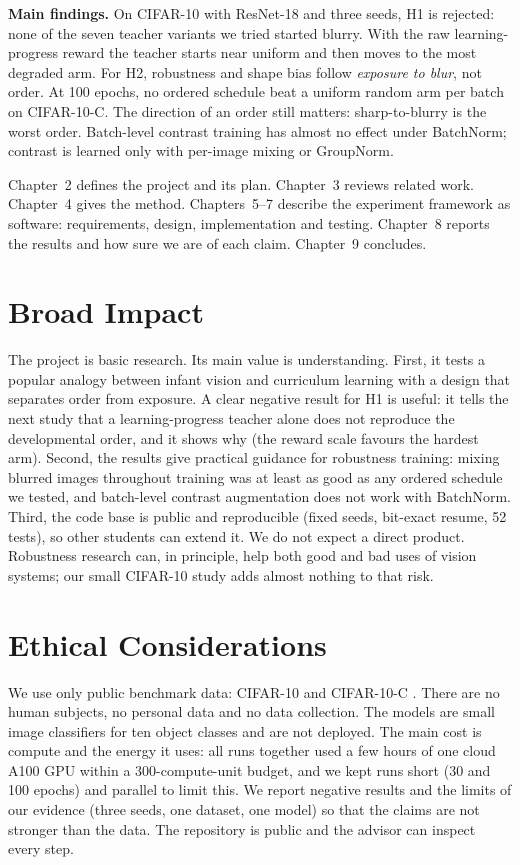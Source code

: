 \documentclass[a4paper,12pt]{report}
\begin{document}
\textbf{Main findings.} On CIFAR-10 with ResNet-18 and three seeds, H1 is rejected: none of the seven teacher variants we tried started blurry. With the raw learning-progress reward the teacher starts near uniform and then moves to the most degraded arm. For H2, robustness and shape bias follow \emph{exposure to blur}, not order. At 100 epochs, no ordered schedule beat a uniform random arm per batch on CIFAR-10-C. The direction of an order still matters: sharp-to-blurry is the worst order. Batch-level contrast training has almost no effect under BatchNorm; contrast is learned only with per-image mixing or GroupNorm.

Chapter~2 defines the project and its plan. Chapter~3 reviews related work. Chapter~4 gives the method. Chapters~5--7 describe the experiment framework as software: requirements, design, implementation and testing. Chapter~8 reports the results and how sure we are of each claim. Chapter~9 concludes.

\section{Broad Impact}

The project is basic research. Its main value is understanding. First, it tests a popular analogy between infant vision and curriculum learning with a design that separates order from exposure. A clear negative result for H1 is useful: it tells the next study that a learning-progress teacher alone does not reproduce the developmental order, and it shows why (the reward scale favours the hardest arm). Second, the results give practical guidance for robustness training: mixing blurred images throughout training was at least as good as any ordered schedule we tested, and batch-level contrast augmentation does not work with BatchNorm. Third, the code base is public and reproducible (fixed seeds, bit-exact resume, 52 tests), so other students can extend it. We do not expect a direct product. Robustness research can, in principle, help both good and bad uses of vision systems; our small CIFAR-10 study adds almost nothing to that risk.

\section{Ethical Considerations}

We use only public benchmark data: CIFAR-10 \cite{krizhevsky2009} and CIFAR-10-C \cite{hendrycks2019}. There are no human subjects, no personal data and no data collection. The models are small image classifiers for ten object classes and are not deployed. The main cost is compute and the energy it uses: all runs together used a few hours of one cloud A100 GPU within a 300-compute-unit budget, and we kept runs short (30 and 100 epochs) and parallel to limit this. We report negative results and the limits of our evidence (three seeds, one dataset, one model) so that the claims are not stronger than the data. The repository is public and the advisor can inspect every step.
\end{document}

